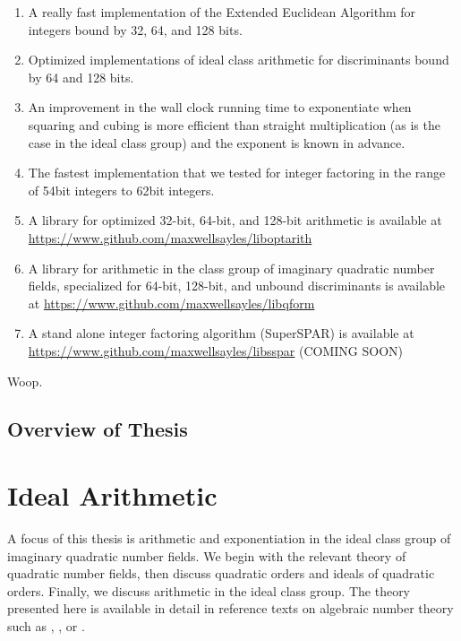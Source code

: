 \documentclass{ucalgthes1}
\theoremstyle{definition}
\begin{document}
\begin{enumerate}
\item A really fast implementation of the Extended Euclidean Algorithm for integers bound by 32, 64, and 128 bits.

\item Optimized implementations of ideal class arithmetic for discriminants bound by 64 and 128 bits.

\item An improvement in the wall clock running time to exponentiate when squaring and cubing is more efficient than straight multiplication (as is the case in the ideal class group) and the exponent is known in advance.

\item The fastest implementation that we tested for integer factoring in the range of 54bit integers to 62bit integers.

\item A library for optimized 32-bit, 64-bit, and 128-bit arithmetic is available at \url{https://www.github.com/maxwellsayles/liboptarith}

\item A library for arithmetic in the class group of imaginary quadratic number fields, specialized for 64-bit, 128-bit, and unbound discriminants is available at \url{https://www.github.com/maxwellsayles/libqform}

\item A stand alone integer factoring algorithm (SuperSPAR) is available at \url{https://www.github.com/maxwellsayles/libsspar}  (COMING SOON)

\end{enumerate}

Woop.

\section{Overview of Thesis}



\chapter{Ideal Arithmetic}
\label{chap:idealArithmetic}

A focus of this thesis is arithmetic and exponentiation in the ideal class group of imaginary quadratic number fields.  We begin with the relevant theory of quadratic number fields, then discuss quadratic orders and ideals of quadratic orders.  Finally, we discuss arithmetic in the ideal class group.  The theory presented here is available in detail in reference texts on algebraic number theory such as \cite{Cohn1980}, \cite{Hua2012}, or \cite{Ireland1990}. 
\end{document}

